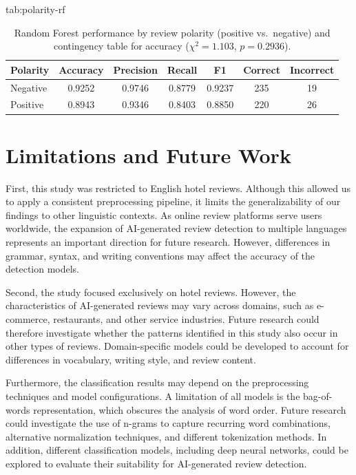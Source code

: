 \documentclass[pmlr]{jmlr}%
\begin{document}
\begin{table}[H]
\floatconts
  {tab:polarity-rf}%
  {\caption{Random Forest performance by review polarity (positive vs.\ negative) and contingency table for accuracy ($\chi^2 = 1.103$, $p = 0.2936$).}}%
  {\begin{tabular}{lcccccc}
  \toprule
  \bfseries Polarity & \bfseries Accuracy & \bfseries Precision & \bfseries Recall & \bfseries F1 & \bfseries Correct & \bfseries Incorrect\\
  \midrule
  Negative & 0.9252 & 0.9746 & 0.8779 & 0.9237 & 235 & 19\\
  Positive & 0.8943 & 0.9346 & 0.8403 & 0.8850 & 220 & 26\\
  \bottomrule
  \end{tabular}}
\end{table}
\section{Limitations and Future Work}
\label{sec:sec:limitations-and-futurework}
First, this study was restricted to English hotel reviews. Although this allowed us to apply a consistent preprocessing pipeline, it limits the generalizability of our findings to other linguistic contexts. 
As online review platforms serve users worldwide, the expansion of AI-generated review detection to multiple languages represents an important direction for future research.
However, differences in grammar, syntax, and writing conventions may affect the accuracy of the detection models. 

Second, the study focused exclusively on hotel reviews. However, the characteristics of AI-generated reviews may vary across domains, such as e-commerce, restaurants, and other service industries. 
Future research could therefore investigate whether the patterns identified in this study also occur in other types of reviews. 
Domain-specific models could be developed to account for differences in vocabulary, writing style, and review content. 

Furthermore, the classification results may depend on the preprocessing techniques and model configurations.
A limitation of all models is the bag-of-words representation, which obscures the analysis of word order.
Future research could investigate the use of n-grams to capture recurring word combinations, alternative normalization techniques, and different tokenization methods. 
In addition, different classification models, including deep neural networks, could be explored to evaluate their suitability for AI-generated review detection. 
\end{document}

